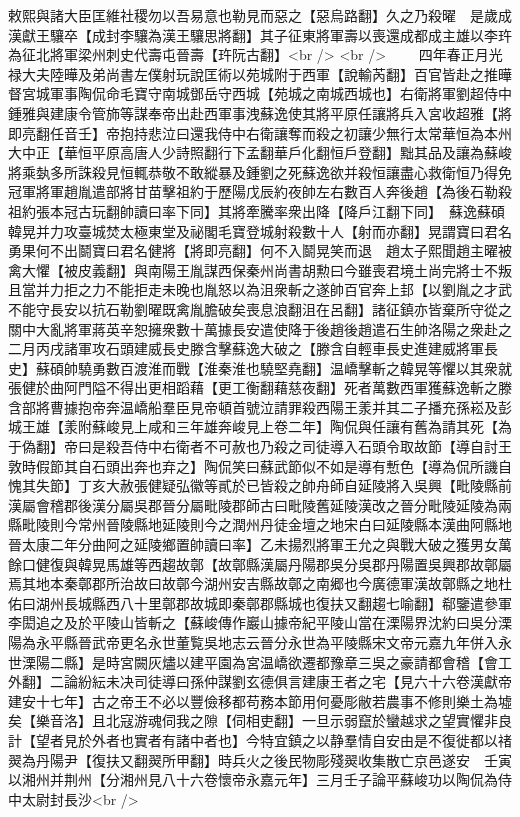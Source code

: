 敕熙與諸大臣匡維社稷勿以吾易意也勒見而惡之【惡烏路翻】久之乃殺曜　是歲成漢獻王驤卒【成封李驤為漢王驤思將翻】其子征東將軍壽以喪還成都成主雄以李玝為征北將軍梁州刺史代壽屯晉壽【玝阮古翻】<br />
<br />
　　四年春正月光禄大夫陸曄及弟尚書左僕射玩說匡術以苑城附于西軍【說輸芮翻】百官皆赴之推曄督宮城軍事陶侃命毛寶守南城鄧岳守西城【苑城之南城西城也】右衛將軍劉超侍中鍾雅與建康令管斾等謀奉帝出赴西軍事洩蘇逸使其將平原任讓將兵入宮收超雅【將即亮翻任音壬】帝抱持悲泣曰還我侍中右衛讓奪而殺之初讓少無行太常華恒為本州大中正【華恒平原高唐人少詩照翻行下孟翻華戶化翻恒戶登翻】黜其品及讓為蘇峻將乘埶多所誅殺見恒輒恭敬不敢縱暴及鍾劉之死蘇逸欲并殺恒讓盡心救衛恒乃得免　冠軍將軍趙胤遣部將甘苗擊祖約于歷陽戊辰約夜帥左右數百人奔後趙【為後石勒殺祖約張本冠古玩翻帥讀曰率下同】其將牽騰率衆出降【降戶江翻下同】　蘇逸蘇碩韓晃并力攻臺城焚太極東堂及祕閣毛寶登城射殺數十人【射而亦翻】晃謂寶曰君名勇果何不出鬬寶曰君名健將【將即亮翻】何不入鬬晃笑而退　趙太子熙聞趙主曜被禽大懼【被皮義翻】與南陽王胤謀西保秦州尚書胡勲曰今雖喪君境土尚完將士不叛且當并力拒之力不能拒走未晚也胤怒以為沮衆斬之遂帥百官奔上邽【以劉胤之才武不能守長安以抗石勒劉曜既禽胤膽破矣喪息浪翻沮在呂翻】諸征鎮亦皆棄所守從之關中大亂將軍蔣英辛恕擁衆數十萬據長安遣使降于後趙後趙遣石生帥洛陽之衆赴之　二月丙戌諸軍攻石頭建威長史滕含擊蘇逸大破之【滕含自輕車長史進建威將軍長史】蘇碩帥驍勇數百渡淮而戰【淮秦淮也驍堅堯翻】温嶠擊斬之韓晃等懼以其衆就張健於曲阿門隘不得出更相蹈藉【更工衡翻藉慈夜翻】死者萬數西軍獲蘇逸斬之滕含部將曹據抱帝奔温嶠船羣臣見帝頓首號泣請罪殺西陽王羕并其二子播充孫崧及彭城王雄【羕附蘇峻見上咸和三年雄奔峻見上卷二年】陶侃與任讓有舊為請其死【為于偽翻】帝曰是殺吾侍中右衛者不可赦也乃殺之司徒導入石頭令取故節【導自討王敦時假節其自石頭出奔也弃之】陶侃笑曰蘇武節似不如是導有慙色【導為侃所譏自愧其失節】丁亥大赦張健疑弘徽等貳於已皆殺之帥舟師自延陵將入吳興【毗陵縣前漢屬會稽郡後漢分屬吳郡晉分屬毗陵郡師古曰毗陵舊延陵漢改之晉分毗陵延陵為兩縣毗陵則今常州晉陵縣地延陵則今之潤州丹徒金壇之地宋白曰延陵縣本漢曲阿縣地晉太康二年分曲阿之延陵鄉置帥讀曰率】乙未揚烈將軍王允之與戰大破之獲男女萬餘口健復與韓晃馬雄等西趨故鄣【故鄣縣漢屬丹陽郡吳分吳郡丹陽置吳興郡故鄣屬焉其地本秦鄣郡所治故曰故鄣今湖州安吉縣故鄣之南郷也今廣德軍漢故鄣縣之地杜佑曰湖州長城縣西八十里鄣郡故城即秦鄣郡縣城也復扶又翻趨七喻翻】郗鑒遣參軍李閎追之及於平陵山皆斬之【蘇峻傳作巖山據帝紀平陵山當在溧陽界沈約曰吳分溧陽為永平縣晉武帝更名永世董覧吳地志云晉分永世為平陵縣宋文帝元嘉九年併入永世溧陽二縣】是時宮闕灰燼以建平園為宮温嶠欲遷都豫章三吳之豪請都會稽【會工外翻】二論紛紜未决司徒導曰孫仲謀劉玄德俱言建康王者之宅【見六十六卷漢獻帝建安十七年】古之帝王不必以豐儉移都苟務本節用何憂彫敝若農事不修則樂土為墟矣【樂音洛】且北寇游魂伺我之隙【伺相吏翻】一旦示弱竄於蠻越求之望實懼非良計【望者見於外者也實者有諸中者也】今特宜鎮之以静羣情自安由是不復徙都以禇翜為丹陽尹【復扶又翻翜所甲翻】時兵火之後民物彫殘翜收集散亡京邑遂安　壬寅以湘州并荆州【分湘州見八十六卷懷帝永嘉元年】三月壬子論平蘇峻功以陶侃為侍中太尉封長沙<br />
